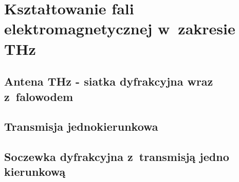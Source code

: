 \chapter{Kształtowanie fali elektromagnetycznej w~zakresie THz }
\label{chap:thz}


\section{Antena THz - siatka dyfrakcyjna wraz z~falowodem}


\section{Transmisja jednokierunkowa}

\section{Soczewka dyfrakcyjna z~transmisją jedno kierunkową}

